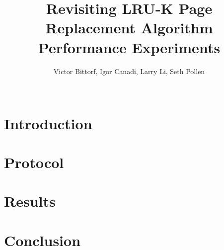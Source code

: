 \documentclass{sig-alternate}
\begin{document}
\title{Revisiting LRU-K Page Replacement Algorithm Performance Experiments}

\author{
	\alignauthor Victor Bittorf, Igor Canadi, Larry Li, Seth Pollen\\
	\\
}

\maketitle



\section{Introduction}
\label{sec:intro}


\section{Protocol}
\label{sec:method}


\section{Results}
\label{sec:results}


\section{Conclusion}
\label{sec:conc}





\end{document}
